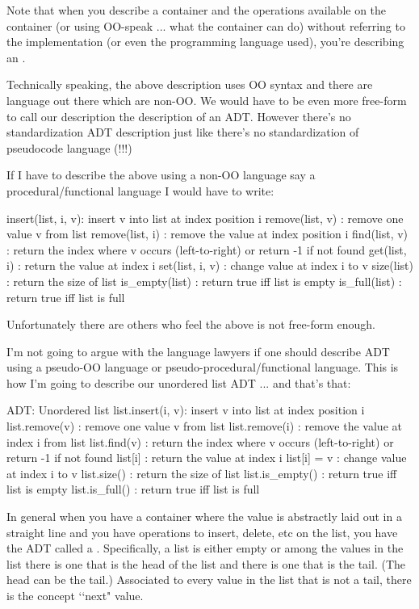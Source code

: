Note that when you describe a container and the operations available
on the container
(or using OO-speak ... what the container can do)
without referring to the implementation (or even the programming language
used), you're describing an .

Technically speaking, the above description uses OO syntax
and there are language out there which are non-OO.
We would have to be even more free-form to call our description
the description of an ADT.
However there's no standardization ADT description
just like there's no standardization of pseudocode language (!!!)

If I have to describe the above using a non-OO language say a 
procedural/functional
language I would have to write:
\begin{console}[fontsize=\footnotesize]
insert(list, i, v): insert v into list at index position i
remove(list, v)   : remove one value v from list
remove(list, i)   : remove the value at index position i
find(list, v)     : return the index where v occurs (left-to-right)
                    or return -1 if not found
get(list, i)      : return the value at index i
set(list, i, v)   : change value at index i to v
size(list)        : return the size of list
is_empty(list)    : return true iff list is empty
is_full(list)     : return true iff list is full
\end{console}
Unfortunately there are others who feel the above is not
free-form enough.

I'm not going to argue with the language lawyers if one should
describe ADT using a pseudo-OO language or
pseudo-procedural/functional
language. This is how I'm going to describe our unordered list ADT
... and that's that:
\begin{console}[fontsize=\footnotesize]
ADT: Unordered list
list.insert(i, v): insert v into list at index position i
list.remove(v)   : remove one value v from list
list.remove(i)   : remove the value at index i from list
list.find(v)     : return the index where v occurs (left-to-right)
                   or return -1 if not found
list[i]          : return the value at index i
list[i] = v      : change value at index i to v
list.size()      : return the size of list
list.is_empty()  : return true iff list is empty
list.is_full()   : return true iff list is full
\end{console}

In general when you have a container where the value
is abstractly laid out in a straight line and you have operations
to insert, delete, etc on the list, you have 
the ADT called a .
Specifically, a list is either empty or among the values in the list
there is one that is the head of the list and there is one that is the tail.
(The head can be the tail.)
Associated to every value in the list that is not a tail, there is the
concept
\lq\lq next" value.

